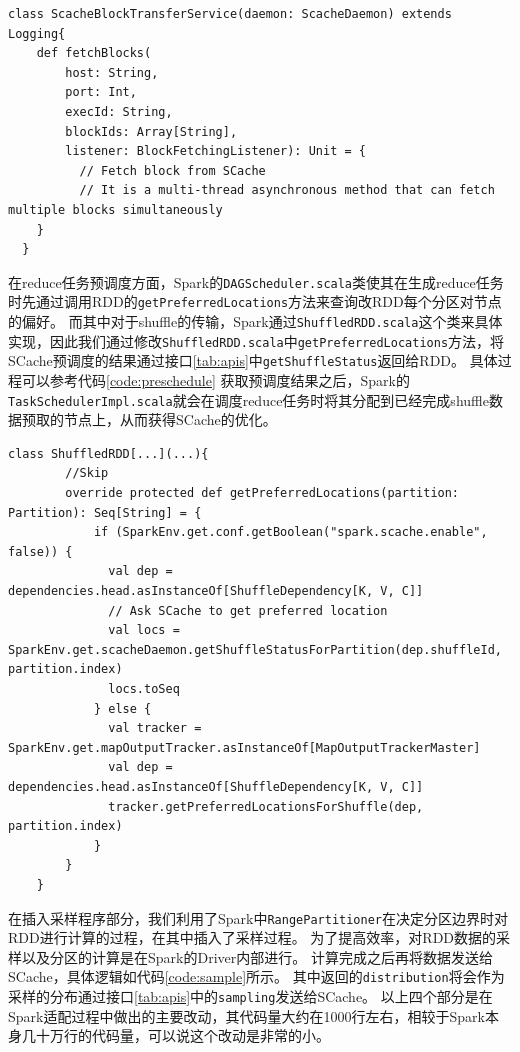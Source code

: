 \begin{lstlisting}[style={myScalastyle}, caption={ScacheBlockTransferService代码片段}, label={code:reader}]
  class ScacheBlockTransferService(daemon: ScacheDaemon) extends Logging{
    def fetchBlocks(
        host: String,
        port: Int,
        execId: String,
        blockIds: Array[String],
        listener: BlockFetchingListener): Unit = {
          // Fetch block from SCache
          // It is a multi-thread asynchronous method that can fetch multiple blocks simultaneously
    }
  }
\end{lstlisting}

在reduce任务预调度方面，Spark的\verb|DAGScheduler.scala|类使其在生成reduce任务时先通过调用RDD的\verb|getPreferredLocations|方法来查询改RDD每个分区对节点的偏好。
而其中对于shuffle的传输，Spark通过\verb|ShuffledRDD.scala|这个类来具体实现，因此我们通过修改\verb|ShuffledRDD.scala|中\verb|getPreferredLocations|方法，将SCache预调度的结果通过接口\ref{tab:apis}中\verb|getShuffleStatus|返回给RDD。
具体过程可以参考代码\ref{code:preschedule}
获取预调度结果之后，Spark的\verb|TaskSchedulerImpl.scala|就会在调度reduce任务时将其分配到已经完成shuffle数据预取的节点上，从而获得SCache的优化。

\begin{lstlisting}[style={myScalastyle}, caption={Reduce预调度代码片段}, label={code:preschedule}]
    class ShuffledRDD[...](...){
        //Skip
        override protected def getPreferredLocations(partition: Partition): Seq[String] = {
            if (SparkEnv.get.conf.getBoolean("spark.scache.enable", false)) {
              val dep = dependencies.head.asInstanceOf[ShuffleDependency[K, V, C]]
              // Ask SCache to get preferred location
              val locs = SparkEnv.get.scacheDaemon.getShuffleStatusForPartition(dep.shuffleId, partition.index)
              locs.toSeq
            } else {
              val tracker = SparkEnv.get.mapOutputTracker.asInstanceOf[MapOutputTrackerMaster]
              val dep = dependencies.head.asInstanceOf[ShuffleDependency[K, V, C]]
              tracker.getPreferredLocationsForShuffle(dep, partition.index)
            }
        }
    }
\end{lstlisting}

在插入采样程序部分，我们利用了Spark中\verb|RangePartitioner|在决定分区边界时对RDD进行计算的过程，在其中插入了采样过程。
为了提高效率，对RDD数据的采样以及分区的计算是在Spark的Driver内部进行。
计算完成之后再将数据发送给SCache，具体逻辑如代码\ref{code:sample}所示。
其中返回的\verb|distribution|将会作为采样的分布通过接口\ref{tab:apis}中的\verb|sampling|发送给SCache。
以上四个部分是在Spark适配过程中做出的主要改动，其代码量大约在1000行左右，相较于Spark本身几十万行的代码量，可以说这个改动是非常的小。

